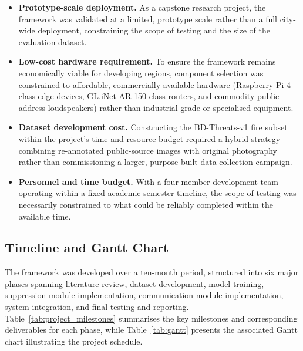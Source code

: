 \begin{itemize}
\item \textbf{Prototype-scale deployment.} As a capstone research project, the framework was validated at a limited, prototype scale rather than a full city-wide deployment, constraining the scope of testing and the size of the evaluation dataset.

\item \textbf{Low-cost hardware requirement.} To ensure the framework remains economically viable for developing regions, component selection was constrained to affordable, commercially available hardware (Raspberry Pi 4-class edge devices, GL.iNet AR-150-class routers, and commodity public-address loudspeakers) rather than industrial-grade or specialised equipment.

\item \textbf{Dataset development cost.} Constructing the BD-Threats-v1 fire subset within the project's time and resource budget required a hybrid strategy combining re-annotated public-source images with original photography rather than commissioning a larger, purpose-built data collection campaign.

\item \textbf{Personnel and time budget.} With a four-member development team operating within a fixed academic semester timeline, the scope of testing was necessarily constrained to what could be reliably completed within the available time.
\end{itemize}

\subsection{Timeline and Gantt Chart}

The framework was developed over a ten-month period, structured into six major phases spanning literature review, dataset development, model training, suppression module implementation, communication module implementation, system integration, and final testing and reporting. Table~\ref{tab:project_milestones} summarises the key milestones and corresponding deliverables for each phase, while Table~\ref{tab:gantt} presents the associated Gantt chart illustrating the project schedule.

